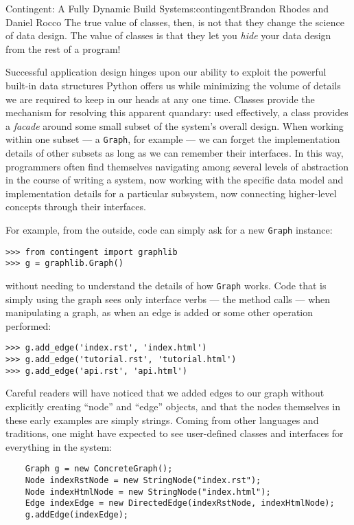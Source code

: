 \begin{aosachapter}{Contingent: A Fully Dynamic Build System}{s:contingent}{Brandon Rhodes and Daniel Rocco}
The true value of classes, then, is not that they change the science of
data design. The value of classes is that they let you \emph{hide} your
data design from the rest of a program!

Successful application design hinges upon our ability to exploit the
powerful built-in data structures Python offers us while minimizing the
volume of details we are required to keep in our heads at any one time.
Classes provide the mechanism for resolving this apparent quandary: used
effectively, a class provides a \emph{facade} around some small subset
of the system's overall design. When working within one subset --- a
\texttt{Graph}, for example --- we can forget the implementation details
of other subsets as long as we can remember their interfaces. In this
way, programmers often find themselves navigating among several levels
of abstraction in the course of writing a system, now working with the
specific data model and implementation details for a particular
subsystem, now connecting higher-level concepts through their
interfaces.

For example, from the outside, code can simply ask for a new
\texttt{Graph} instance:

\begin{verbatim}
>>> from contingent import graphlib
>>> g = graphlib.Graph()
\end{verbatim}

without needing to understand the details of how \texttt{Graph} works.
Code that is simply using the graph sees only interface verbs --- the
method calls --- when manipulating a graph, as when an edge is added or
some other operation performed:

\begin{verbatim}
>>> g.add_edge('index.rst', 'index.html')
>>> g.add_edge('tutorial.rst', 'tutorial.html')
>>> g.add_edge('api.rst', 'api.html')
\end{verbatim}

Careful readers will have noticed that we added edges to our graph
without explicitly creating ``node'' and ``edge'' objects, and that the
nodes themselves in these early examples are simply strings. Coming from
other languages and traditions, one might have expected to see
user-defined classes and interfaces for everything in the system:

\begin{verbatim}
    Graph g = new ConcreteGraph();
    Node indexRstNode = new StringNode("index.rst");
    Node indexHtmlNode = new StringNode("index.html");
    Edge indexEdge = new DirectedEdge(indexRstNode, indexHtmlNode);
    g.addEdge(indexEdge);
\end{verbatim}


\end{aosachapter}

